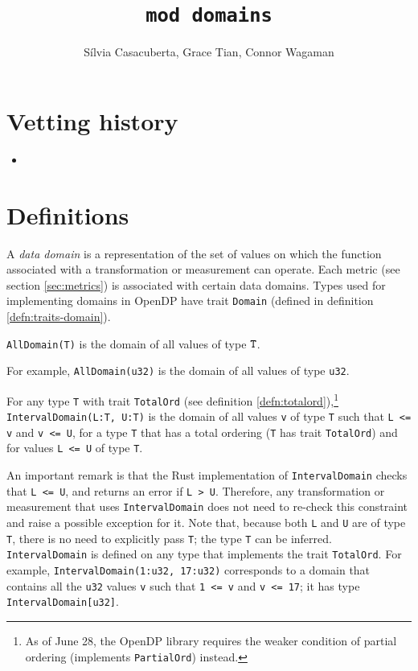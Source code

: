 \documentclass{article}
\title{\texttt{mod domains}}
\author{S\'ilvia Casacuberta, Grace Tian, Connor Wagaman}
\date{}
\begin{document}
\maketitle

\contrib

\section{Vetting history}
\begin{itemize}
    \item {}
\end{itemize}

\section{Definitions}
A \emph{data domain} is a representation of the set of values on which the function associated with a transformation or measurement can operate.  Each metric (see section \ref{sec:metrics}) is associated with certain data domains. Types used for implementing domains in OpenDP have trait \texttt{Domain} (defined in definition \ref{defn:traits-domain}).
\begin{definition}
\texttt{AllDomain(T)} is the domain of all values of type $\texttt{T}$. 
\end{definition}
For example, \texttt{AllDomain(u32)} is the domain of all values of type \texttt{u32}.
\begin{definition} For any type \texttt{T} with trait \texttt{TotalOrd} (see definition \ref{defn:totalord}),\footnote{As of June 28, the OpenDP library requires the weaker condition of partial ordering (implements \texttt{PartialOrd}) instead.} \texttt{IntervalDomain(L:T, U:T)} is the domain of all values \texttt{v} of type \texttt{T} such that \texttt{L <= v} and \texttt{v <= U}, for a type \texttt{T} that has a total ordering (\texttt{T} has trait \texttt{TotalOrd}) and for values \texttt{L <= U} of type \texttt{T}. 
\end{definition}
An important remark is that the Rust implementation of \texttt{IntervalDomain} checks that \texttt{L <= U}, and returns an error if \texttt{L > U}. Therefore, any transformation or measurement that uses \texttt{IntervalDomain} does not need to re-check this constraint and raise a possible exception for it. 
Note that, because both \texttt{L} and \texttt{U} are of type \texttt{T}, there is no need to explicitly pass \texttt{T}; the type \texttt{T} can be inferred. \texttt{IntervalDomain} is defined on any type that implements the trait \texttt{TotalOrd}. For example, \texttt{IntervalDomain(1:u32, 17:u32)} corresponds to a domain that contains all the \texttt{u32} values \texttt{v} such that \texttt{1 <= v} and \texttt{v <= 17}; it has type \texttt{IntervalDomain[u32]}.
\end{document}
